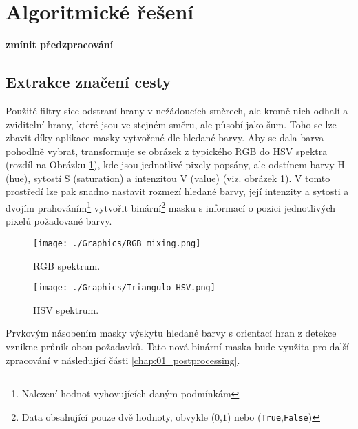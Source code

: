 \documentclass[czech, bc, kky, he, iso690alph]{fasthesis}
\begin{document}
        \section{Algoritmické řešení}
        \textbf{zmínit předzpracování}
            \subsection{Extrakce značení cesty}
            	Použité filtry sice odstraní hrany v nežádoucích směrech, ale kromě nich odhalí a zviditelní hrany, které jsou ve stejném směru, ale působí jako šum. Toho se lze zbavit díky aplikace masky vytvořené dle hledané barvy. Aby se dala barva pohodlně vybrat, transformuje se obrázek z typického RGB do HSV spektra (rozdíl na Obrázku \ref{pic:HSV_spektrum}), kde jsou jednotlivé pixely popsány, ale odstínem barvy H (hue), sytostí S (saturation) a intenzitou V (value) (viz. obrázek \ref{pic:HSV_spektrum}). V tomto prostředí lze pak snadno nastavit rozmezí hledané barvy, její intenzity a sytosti a dvojím prahováním\footnote{Nalezení hodnot vyhovujících daným podmínkám} vytvořit binární\footnote{Data obsahující pouze dvě hodnoty, obvykle (\(0\),\(1\)) nebo (\verb"True",\verb"False")} masku s informací o pozici jednotlivých pixelů požadované barvy.\\
            	\begin{figure}[ht]
            		\centering
            		\texttt{[image: ./Graphics/RGB\_mixing.png]}
            		\caption{RGB spektrum.}
            	\end{figure}
            	
            	\begin{figure}[ht]
            		\centering
            		\texttt{[image: ./Graphics/Triangulo\_HSV.png]}
            		\caption{HSV spektrum.}
            		\label{pic:HSV_spektrum}
            	\end{figure}
            	
            	Prvkovým násobením masky výskytu hledané barvy s orientací hran z detekce vznikne průnik obou požadavků. Tato nová binární maska bude využita pro další zpracování v následující části \ref{chap:01_postprocessing}.
            	
\end{document}
